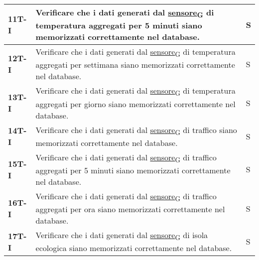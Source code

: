 \begin{longtable}{|>{\raggedright\arraybackslash}m{}|>{\raggedright\arraybackslash}m{}|>{\raggedright\arraybackslash}m{}|}
	\hline
	\textbf{11T-I}  & Verificare che i dati generati dal \href{https://7last.github.io/docs/rtb/documentazione-interna/glossario\#sensore}{sensore\textsubscript{G}} di temperatura aggregati per 5 minuti siano memorizzati correttamente nel database.                                                                                                  & S              \\
	\hline
	\textbf{12T-I}  & Verificare che i dati generati dal \href{https://7last.github.io/docs/rtb/documentazione-interna/glossario\#sensore}{sensore\textsubscript{G}} di temperatura aggregati per settimana siano memorizzati correttamente nel database.                                                                                                 & S              \\
	\hline
	\textbf{13T-I}  & Verificare che i dati generati dal \href{https://7last.github.io/docs/rtb/documentazione-interna/glossario\#sensore}{sensore\textsubscript{G}} di temperatura aggregati per giorno siano memorizzati correttamente nel database.                                                                                                    & S              \\
	\hline
	\textbf{14T-I}  & Verificare che i dati generati dal \href{https://7last.github.io/docs/rtb/documentazione-interna/glossario\#sensore}{sensore\textsubscript{G}} di traffico siano memorizzati correttamente nel database.                                                                                                                            & S              \\
	\hline
	\textbf{15T-I}  & Verificare che i dati generati dal \href{https://7last.github.io/docs/rtb/documentazione-interna/glossario\#sensore}{sensore\textsubscript{G}} di traffico aggregati per 5 minuti siano memorizzati correttamente nel database.                                                                                                     & S              \\
	\hline
	\textbf{16T-I}  & Verificare che i dati generati dal \href{https://7last.github.io/docs/rtb/documentazione-interna/glossario\#sensore}{sensore\textsubscript{G}} di traffico aggregati per ora siano memorizzati correttamente nel database.                                                                                                          & S              \\
	\hline
	\textbf{17T-I}  & Verificare che i dati generati dal \href{https://7last.github.io/docs/rtb/documentazione-interna/glossario\#sensore}{sensore\textsubscript{G}} di isola ecologica siano memorizzati correttamente nel database.                                                                                                                     & S              \\

\end{longtable}

